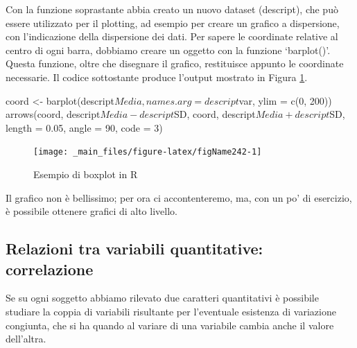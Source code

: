 \documentclass[a4paper,12pt,oneside]{book}
\newenvironment{Shaded}{}{}
\newcommand{\KeywordTok}[1]{#1}
\newcommand{\DataTypeTok}[1]{#1}
\newcommand{\DecValTok}[1]{#1}
\newcommand{\FloatTok}[1]{#1}
\newcommand{\StringTok}[1]{#1}
\newcommand{\OperatorTok}[1]{#1}
\newcommand{\NormalTok}[1]{#1}
\begin{document}
Con la funzione soprastante abbia creato un nuovo dataset (descript), che può essere utilizzato per il plotting, ad esempio per creare un grafico a dispersione, con l'indicazione della dispersione dei dati. Per sapere le coordinate relative al centro di ogni barra, dobbiamo creare un oggetto con la funzione `barplot()'. Questa funzione, oltre che disegnare il grafico, restituisce appunto le coordinate necessarie. Il codice sottostante produce l'output mostrato in Figura \ref{fig:figName242}.

\begin{Shaded}
\begin{Highlighting}[]
\NormalTok{coord <-}\StringTok{ }\KeywordTok{barplot}\NormalTok{(descript}\OperatorTok{$}\NormalTok{Media, }\DataTypeTok{names.arg =}\NormalTok{ descript}\OperatorTok{$}\NormalTok{var, }
                 \DataTypeTok{ylim =} \KeywordTok{c}\NormalTok{(}\DecValTok{0}\NormalTok{, }\DecValTok{200}\NormalTok{))}
\KeywordTok{arrows}\NormalTok{(coord, descript}\OperatorTok{$}\NormalTok{Media }\OperatorTok{-}\StringTok{ }\NormalTok{descript}\OperatorTok{$}\NormalTok{SD, }
\NormalTok{       coord, descript}\OperatorTok{$}\NormalTok{Media }\OperatorTok{+}\StringTok{ }\NormalTok{descript}\OperatorTok{$}\NormalTok{SD, }
       \DataTypeTok{length =} \FloatTok{0.05}\NormalTok{, }\DataTypeTok{angle =} \DecValTok{90}\NormalTok{, }\DataTypeTok{code =} \DecValTok{3}\NormalTok{)}
\end{Highlighting}
\end{Shaded}

\begin{figure}

{\centering \texttt{[image: \_main\_files/figure-latex/figName242-1]} 

}

\caption{Esempio di boxplot in R}\label{fig:figName242}
\end{figure}

Il grafico non è bellissimo; per ora ci accontenteremo, ma, con un po' di esercizio, è possibile ottenere grafici di alto livello.

\hypertarget{relazioni-tra-variabili-quantitative-correlazione}{%
\subsection{Relazioni tra variabili quantitative: correlazione}\label{relazioni-tra-variabili-quantitative-correlazione}}

Se su ogni soggetto abbiamo rilevato due caratteri quantitativi è possibile studiare la coppia di variabili risultante per l'eventuale esistenza di variazione congiunta, che si ha quando al variare di una variabile cambia anche il valore dell'altra.
\end{document}
